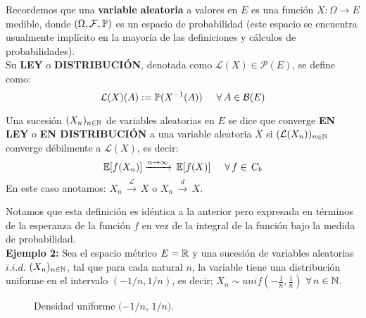 Recordemos que una \textbf{variable aleatoria} a valores en $E$ es una función $X:\Omega \rightarrow E$ medible, donde $(\Omega, \mathcal{F},\mathbb{P})$ es un espacio de probabilidad (este espacio se encuentra usualmente implícito en la mayoría de las definiciones y cálculos de probabilidades).\\ 
Su \textbf{LEY} o \textbf{DISTRIBUCIÓN}, denotada como $\mathcal{L}(X) \in \mathcal{P}(E)$, se define como:
\begin{equation}
   \mathcal{L}(X)(A) := \mathbb{P}(X^{-1}(A))\hspace{0.5cm}\forall\,A\in\mathcal{B}(E) 
\end{equation}

\begin{definicion} Una sucesión $(X_n)_{n\in\mathbb N}$ de variables aleatorias en $E$ se dice que converge \textbf{EN LEY} o \textbf{EN DISTRIBUCIÓN} a una variable aleatoria $X$ si $(\mathcal{L}(X_n))_{n\in\mathbb N}$ converge débilmente a $\mathcal{L}(X)$, es decir:
\[\mathbb E[f(X_n)] \xrightarrow{n\rightarrow\infty}\,\mathbb E[f(X)]\hspace{0.5cm}\forall\,f\in\,C_b\]
En este caso anotamos: $X_n\,\xrightarrow{\mathcal{L}}\,X$ o $X_n\,\xrightarrow{d}\,X$.
\end{definicion}

Notamos que esta definición es idéntica a la anterior pero expresada en términos de la esperanza de la función $f$ en vez de la integral de la función bajo la medida de probabilidad.\\\newline
\textbf{Ejemplo 2:} Sea el espacio métrico $E=\mathbb R$ y una sucesión de variables aleatorias $i.i.d.$ $(X_n)_{n\in\mathbb N}$, tal que para cada natural $n$, la variable tiene una distribución uniforme en el intervalo $(-1/n, 1/n)$, es decir; $X_n \sim unif(-\frac{1}{n},\frac{1}{n})$ $\forall\,n\in\mathbb N$.
\begin{figure}[h]
\centering
    \caption{Densidad uniforme $(-1/n$, $1/n)$.}
\end{figure}

